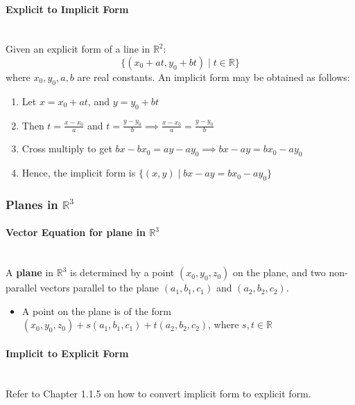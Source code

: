 \documentclass[../ma2001_notes.tex]{subfiles}
\begin{document}
\paragraph{Explicit to Implicit Form}\,\\
Given an explicit form of a line in \(\mathbb{R}^2\):
\[\{(x_0+at, y_0+bt)\mid t\in\mathbb{R}\}\]
where \(x_0,y_0,a,b\) are real constants. An implicit form may be obtained as follows:
\begin{enumerate}
	\item Let \(x=x_0+at\), and \(y=y_0+bt\)
	\item Then \(\displaystyle t=\frac{x-x_0}{a}\) and \(\displaystyle t=\frac{y-y_0}{b}\implies\frac{x-x_0}{a}=\frac{y-y_0}{b}\)
	\item Cross multiply to get \(bx-bx_0=ay-ay_0\implies bx-ay=bx_0-ay_0\)
	\item Hence, the implicit form is \(\{(x,y)\mid bx-ay=bx_0-ay_0\}\)
\end{enumerate}

\subsubsection{Planes in $\mathbb{R}^3$}
\paragraph{Vector Equation for plane in $\mathbb{R}^3$}\,\\
A \textbf{plane} in \(\mathbb{R}^3\) is determined by a point \((x_0,y_0,z_0)\) on the plane, and two non-parallel vectors parallel to the plane \((a_1,b_1,c_1)\) and \((a_2,b_2,c_2)\).
\begin{itemize}
	\item A point on the plane is of the form \((x_0,y_0,z_0)+s(a_1,b_1,c_1)+t(a_2,b_2,c_2)\), where \(s,t\in\mathbb{R}\)
\end{itemize}

\paragraph{Implicit to Explicit Form}\,\\
Refer to Chapter 1.1.5 on how to convert implicit form to explicit form.
\end{document}
